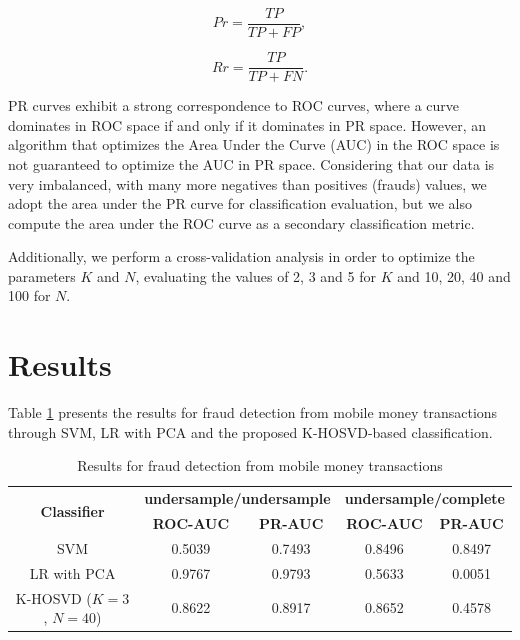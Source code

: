 \begin{equation}\label{eq:4_eq06}
	Pr = \frac{TP}{TP + FP},
\end{equation}

\begin{equation}\label{eq:4_eq07}
	Rr = \frac{TP}{TP + FN}.
\end{equation}

PR curves exhibit a strong correspondence to ROC curves, where a curve dominates in ROC space if and only if it dominates in PR space. However, an algorithm that optimizes the Area Under the Curve (AUC) in the ROC space is not guaranteed to optimize the AUC in PR space. Considering that our data is very imbalanced, with many more negatives than positives (frauds) values, we adopt the area under the PR curve for classification evaluation, but we also compute the area under the ROC curve as a secondary classification metric.

Additionally, we perform a cross-validation analysis in order to optimize the parameters $K$ and $N$, evaluating the values of 2, 3 and 5 for $K$ and 10, 20, 40 and 100 for $N$.


\section{Results}
\label{sec:4_results}

Table \ref{tab:4_tab1} presents the results for fraud detection from mobile money transactions through SVM, LR with PCA and the proposed K-HOSVD-based classification.

\begin{table}[h!]
  \centering
  \caption{Results for fraud detection from mobile money transactions} 
  \label{tab:4_tab1}
  \begin{tabular}{ c c c c c }
	\toprule
	\multirow{2}{*}{\textbf{Classifier}}   &\multicolumn{2}{c}{\textbf{undersample/undersample}} &\multicolumn{2}{c}{\textbf{undersample/complete}}\\ 
			\hhline{~----}
			&\textbf{ROC-AUC} &\textbf{PR-AUC} &\textbf{ROC-AUC} &\textbf{PR-AUC}\\
	\midrule
	SVM &0.5039 &0.7493 &0.8496 &0.8497 \\
	LR with PCA &0.9767 &0.9793 &0.5633 &0.0051 \\
	K-HOSVD ($K=3$, $N=40$) &0.8622 &0.8917 &0.8652 &0.4578 \\
    \bottomrule
  \end{tabular}
\end{table}

